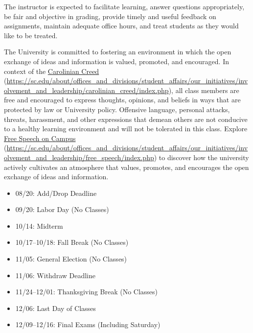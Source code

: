 \documentclass[11pt,letterpaper]{article}
\begin{document}

The instructor is expected to facilitate learning, answer questions appropriately, be fair and objective in grading, provide timely and useful feedback on assignments, maintain adequate office hours, and treat students as they would like to be treated. \sectionbreak




The University is committed to fostering an environment in which the open exchange of ideas and information is valued, promoted, and encouraged.  In context of the \href{https://sc.edu/about/offices\_and\_divisions/student\_affairs/our\_initiatives/involvement\_and\_leadership/carolinian\_creed/index.php}{Carolinian Creed} (\url{https://sc.edu/about/offices\_and\_divisions/student\_affairs/our\_initiatives/involvement\_and\_leadership/carolinian\_creed/index.php}), all class members are free and encouraged to express thoughts, opinions, and beliefs in ways that are protected by law or University policy. Offensive language, personal attacks, threats, harassment, and other expressions that demean others are not conducive to a healthy learning environment and will not be tolerated in this class. Explore \href{https://sc.edu/about/offices\_and\_divisions/student\_affairs/our\_initiatives/involvement\_and\_leadership/free\_speech/index.php}{Free Speech on Campus} (\url{https://sc.edu/about/offices\_and\_divisions/student\_affairs/our\_initiatives/involvement\_and\_leadership/free\_speech/index.php}) to discover how the university actively cultivates an atmosphere that values, promotes, and encourages the open exchange of ideas and information. \sectionbreak





\newpage






	\begin{itemize}
	\item 08/20: Add/Drop Deadline
	\item 09/20: Labor Day (No Classes)
	\item 10/14: Midterm
	\item 10/17--10/18: Fall Break (No Classes)
	\item 11/05: General Election (No Classes)
	\item 11/06: Withdraw Deadline
	\item 11/24--12/01: Thanksgiving Break (No Classes)
	\item 12/06: Last Day of Classes
	\item 12/09--12/16: Final Exams (Including Saturday)
	\end{itemize}
\end{document}
